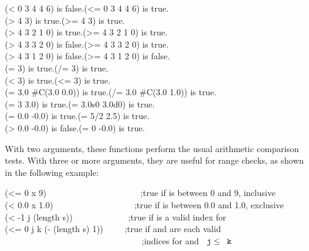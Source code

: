 \begin{defun}[Function]
\begin{lisp}
(< 0 3 4 4 6) \textrm{is false.}\>(<= 0 3 4 4 6) \textrm{is true.} \\
(> 4 3) \textrm{is true.}\>(>= 4 3) \textrm{is true.} \\
(> 4 3 2 1 0) \textrm{is true.}\>(>= 4 3 2 1 0) \textrm{is true.} \\
(> 4 3 3 2 0) \textrm{is false.}\>(>= 4 3 3 2 0) \textrm{is true.} \\
(> 4 3 1 2 0) \textrm{is false.}\>(>= 4 3 1 2 0) \textrm{is false.} \\
(= 3) \textrm{is true.}\>(/= 3) \textrm{is true.} \\
(< 3) \textrm{is true.}\>(<= 3) \textrm{is true.} \\
(= 3.0 \#C(3.0 0.0)) \textrm{is true.}\>(/= 3.0 \#C(3.0 1.0)) \textrm{is true.} \\
(= 3 3.0) \textrm{is true.}\>(= 3.0s0 3.0d0) \textrm{is true.} \\
(= 0.0 -0.0) \textrm{is true.}\>(= 5/2 2.5) \textrm{is true.} \\
(> 0.0 -0.0) \textrm{is false.}\>(= 0 -0.0) \textrm{is true.}
\end{lisp}
With two arguments, these functions perform the usual arithmetic
comparison tests.
With three or more arguments, they are useful for range checks,
as shown in the following example:
\begin{lisp}
(<= 0 x 9)~~~~~~~~~~~~~~~~~~~~~~;\textrm{true if  is between 0 and 9, inclusive} \\
(< 0.0 x 1.0)~~~~~~~~~~~~~~~~~~~;\textrm{true if  is between 0.0 and 1.0, exclusive} \\
(< -1 j (length s))~~~~~~~~~~~~~;\textrm{true if  is a valid index for } \\
(<= 0 j k (- (length s) 1))~~~~~;\textrm{true if  and  are each valid} \\
~~~~~~~~~~~~~~~~~~~~~~~~~~~~~~~~;\textrm{indices for  and $\cdf{j}\leq\cdf{k}$}
\end{lisp}


\end{defun}
